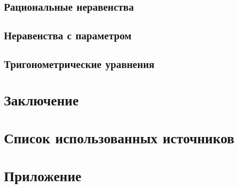 \documentclass[oneside,final,14pt]{extarticle} %
\begin{document}
\subsection{Рациональные неравенства}

\newpage

\subsection{Неравенства с параметром}

\newpage

\subsection{Тригонометрические уравнения}

\newpage

\section*{Заключение}

\newpage


\section*{Список использованных источников}
\setlength{\parindent}{0cm}

\newpage

\section*{Приложение}
\setlength{\parindent}{0cm}

\newpage

\appendix
\end{document}
